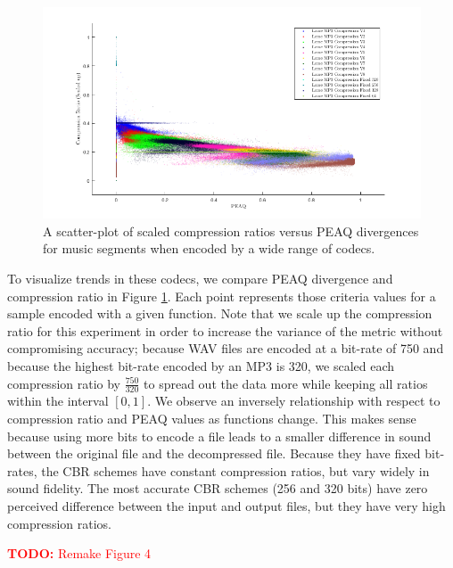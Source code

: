 \documentclass{article}
\newcommand\todo[1]{\textcolor{red}{\textbf{TODO:} #1}}
\begin{document}
{\begin{figure}
    \centering
    \includegraphics[width=\textwidth,trim={3cm 0 5cm 0},clip]{codec_figures/peaq_vs_cr_music2.png}
    \caption{A scatter-plot of scaled compression ratios versus PEAQ divergences for music segments when encoded by a wide range of codecs.}
    \label{peaq_cr}
\end{figure}

To visualize trends in these codecs, we compare PEAQ divergence and compression ratio in Figure \ref{peaq_cr}. Each point represents those criteria values for a sample encoded with a given function. Note that we scale up the compression ratio for this experiment in order to increase the variance of the metric without compromising accuracy; because WAV files are encoded at a bit-rate of 750 and because the highest bit-rate encoded by an MP3 is 320, we scaled each compression ratio by $\frac{750}{320}$ to spread out the data more while keeping all ratios within the interval $[0,1]$. We observe an inversely relationship with respect to compression ratio and PEAQ values as functions change. This makes sense because using more bits to encode a file leads to a smaller difference in sound between the original file and the decompressed file. Because they have fixed bit-rates, the CBR schemes have constant compression ratios, but vary widely in sound fidelity. The most accurate CBR schemes (256 and 320 bits) have zero perceived difference between the input and output files, but they have very high compression ratios.

\todo{Remake Figure 4}

}
\end{document}
